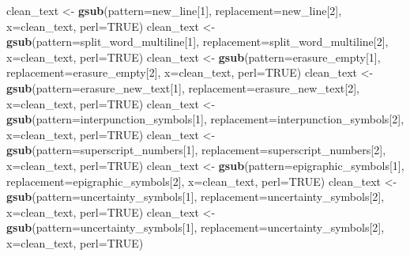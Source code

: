 \documentclass[]{article}
\newenvironment{Shaded}{\begin{snugshade}}{\end{snugshade}}
\newcommand{\DataTypeTok}[1]{\textcolor[rgb]{0.13,0.29,0.53}{#1}}
\newcommand{\DecValTok}[1]{\textcolor[rgb]{0.00,0.00,0.81}{#1}}
\newcommand{\KeywordTok}[1]{\textcolor[rgb]{0.13,0.29,0.53}{\textbf{#1}}}
\newcommand{\NormalTok}[1]{#1}
\newcommand{\OtherTok}[1]{\textcolor[rgb]{0.56,0.35,0.01}{#1}}
\newcommand{\StringTok}[1]{\textcolor[rgb]{0.31,0.60,0.02}{#1}}
\begin{document}
\begin{Shaded}
\begin{Highlighting}[]
\NormalTok{  clean_text <-}\StringTok{ }\KeywordTok{gsub}\NormalTok{(}\DataTypeTok{pattern=}\NormalTok{new_line[}\DecValTok{1}\NormalTok{], }\DataTypeTok{replacement=}\NormalTok{new_line[}\DecValTok{2}\NormalTok{], }\DataTypeTok{x=}\NormalTok{clean_text, }\DataTypeTok{perl=}\OtherTok{TRUE}\NormalTok{)}
\NormalTok{  clean_text <-}\StringTok{ }\KeywordTok{gsub}\NormalTok{(}\DataTypeTok{pattern=}\NormalTok{split_word_multiline[}\DecValTok{1}\NormalTok{], }\DataTypeTok{replacement=}\NormalTok{split_word_multiline[}\DecValTok{2}\NormalTok{], }\DataTypeTok{x=}\NormalTok{clean_text, }\DataTypeTok{perl=}\OtherTok{TRUE}\NormalTok{)}
\NormalTok{  clean_text <-}\StringTok{ }\KeywordTok{gsub}\NormalTok{(}\DataTypeTok{pattern=}\NormalTok{erasure_empty[}\DecValTok{1}\NormalTok{], }\DataTypeTok{replacement=}\NormalTok{erasure_empty[}\DecValTok{2}\NormalTok{], }\DataTypeTok{x=}\NormalTok{clean_text, }\DataTypeTok{perl=}\OtherTok{TRUE}\NormalTok{)}
\NormalTok{  clean_text <-}\StringTok{ }\KeywordTok{gsub}\NormalTok{(}\DataTypeTok{pattern=}\NormalTok{erasure_new_text[}\DecValTok{1}\NormalTok{], }\DataTypeTok{replacement=}\NormalTok{erasure_new_text[}\DecValTok{2}\NormalTok{], }\DataTypeTok{x=}\NormalTok{clean_text, }\DataTypeTok{perl=}\OtherTok{TRUE}\NormalTok{)}
\NormalTok{  clean_text <-}\StringTok{ }\KeywordTok{gsub}\NormalTok{(}\DataTypeTok{pattern=}\NormalTok{interpunction_symbols[}\DecValTok{1}\NormalTok{], }\DataTypeTok{replacement=}\NormalTok{interpunction_symbols[}\DecValTok{2}\NormalTok{], }\DataTypeTok{x=}\NormalTok{clean_text, }\DataTypeTok{perl=}\OtherTok{TRUE}\NormalTok{)}
\NormalTok{  clean_text <-}\StringTok{ }\KeywordTok{gsub}\NormalTok{(}\DataTypeTok{pattern=}\NormalTok{superscript_numbers[}\DecValTok{1}\NormalTok{], }\DataTypeTok{replacement=}\NormalTok{superscript_numbers[}\DecValTok{2}\NormalTok{], }\DataTypeTok{x=}\NormalTok{clean_text, }\DataTypeTok{perl=}\OtherTok{TRUE}\NormalTok{)}
\NormalTok{  clean_text <-}\StringTok{ }\KeywordTok{gsub}\NormalTok{(}\DataTypeTok{pattern=}\NormalTok{epigraphic_symbols[}\DecValTok{1}\NormalTok{], }\DataTypeTok{replacement=}\NormalTok{epigraphic_symbols[}\DecValTok{2}\NormalTok{], }\DataTypeTok{x=}\NormalTok{clean_text, }\DataTypeTok{perl=}\OtherTok{TRUE}\NormalTok{)}
\NormalTok{  clean_text <-}\StringTok{ }\KeywordTok{gsub}\NormalTok{(}\DataTypeTok{pattern=}\NormalTok{uncertainty_symbols[}\DecValTok{1}\NormalTok{], }\DataTypeTok{replacement=}\NormalTok{uncertainty_symbols[}\DecValTok{2}\NormalTok{], }\DataTypeTok{x=}\NormalTok{clean_text, }\DataTypeTok{perl=}\OtherTok{TRUE}\NormalTok{)}
\NormalTok{  clean_text <-}\StringTok{ }\KeywordTok{gsub}\NormalTok{(}\DataTypeTok{pattern=}\NormalTok{uncertainty_symbols[}\DecValTok{1}\NormalTok{], }\DataTypeTok{replacement=}\NormalTok{uncertainty_symbols[}\DecValTok{2}\NormalTok{], }\DataTypeTok{x=}\NormalTok{clean_text, }\DataTypeTok{perl=}\OtherTok{TRUE}\NormalTok{)}

\end{Highlighting}
\end{Shaded}
\end{document}
